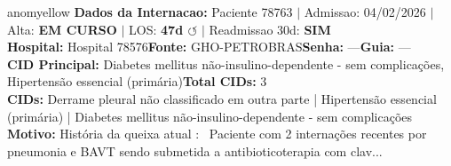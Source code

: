 \documentclass[a4paper,10pt]{article}
\begin{document}
\begin{anomalycard}[Internacao 164361 | GHO-PETROBRAS | MODERADO (z=2.34)]{anomyellow}
\textbf{Dados da Internacao:} Paciente 78763 $\mid$ Admissao: 04/02/2026 $\mid$ Alta: \textcolor{anomorange}{\textbf{EM CURSO}} $\mid$ LOS: \textbf{47d \textcolor{anomorange}{$\circlearrowleft$}} $\mid$ Readmissao 30d: \textcolor{anomred}{\textbf{SIM}}\\
\textbf{Hospital:} Hospital 78576\quad\textbf{Fonte:} GHO-PETROBRAS\quad\textbf{Senha:} ---\quad\textbf{Guia:} ---\\
\textbf{CID Principal:} {\small Diabetes mellitus não-insulino-dependente - sem complicações, Hipertensão essencial (primária)}\quad\textbf{Total CIDs:} 3\\

\textbf{CIDs:} {\scriptsize Derrame pleural não classificado em outra parte | Hipertensão essencial (primária) | Diabetes mellitus não-insulino-dependente - sem complicações}\\

\textbf{Motivo:} {\scriptsize História da queixa atual :  Paciente com 2 internações recentes por pneumonia e BAVT sendo submetida a antibioticoterapia com clav...}\\


\end{anomalycard}
\end{document}
